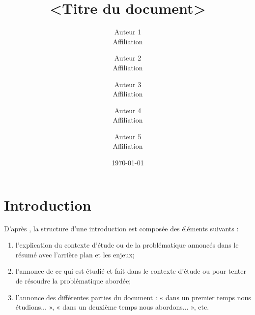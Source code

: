 \documentclass[11pt,a4paper,french]{article}
\begin{document}

\title{<Titre du document>}

\author{
	Auteur 1\\Affiliation\and
	Auteur 2\\Affiliation\and
	Auteur 3\\Affiliation\and
	Auteur 4\\Affiliation\and
	Auteur 5\\Affiliation
}



\date{\today}

\IMTAfrontcover
\pagestyle{IMTAfancy} %

\IMTAsommaire
\newpage
\IMTAlistefigures  %
\IMTAlistetableaux   %
\newpage

\section{Introduction} %

D'après \cite{[Lichtfouse2012]}, la structure d'une introduction est composée des éléments suivants :
\begin{enumerate}
	\item l'explication du contexte d'étude ou de la problématique annoncés dans le résumé avec l'arrière
	      plan et les enjeux;
	\item l'annonce de ce qui est étudié et fait dans le contexte d'étude ou pour tenter de résoudre la
	      problématique abordée;
	\item l'annonce des différentes parties du document : « dans un premier temps nous étudions... », « dans
	un deuxième temps nous abordons... », etc.
\end{enumerate}
\end{document}
